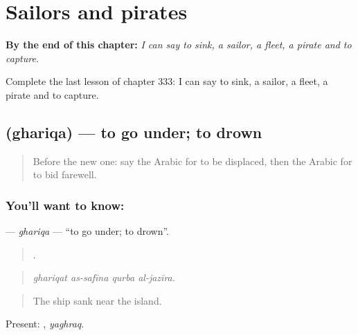 
\chapter{Sailors and pirates}
\label{ch:ar-sailors-and-pirates}

\begin{chapteropening}
\textbf{By the end of this chapter:} \emph{I can say to sink, a sailor, a fleet, a pirate and to capture.}

Complete the last lesson of chapter 333: I can say to sink, a sailor, a fleet, a pirate and to capture.
\end{chapteropening}

\section[\texorpdfstring{\ar{غرق} (ghariqa)}{غرق (ghariqa)}]{ (ghariqa) — to go under; to drown}

\label{lesson:AR-C333-ghariqa}



\begin{quote}
Before the new one: say the Arabic for to be displaced, then the Arabic for to bid farewell.
\end{quote}

\subsection*{You'll want to know: }
\textbf{} — \emph{ghariqa} — \textquotedblleft{}to go under; to drown\textquotedblright{}.

\begin{quote}
   .
\end{quote}

\begin{quote}
\emph{ghariqat as-safīna qurba al-jazīra.}
\end{quote}

\begin{quote}
The ship sank near the island.
\end{quote}

Present: , \emph{yaghraq}.

